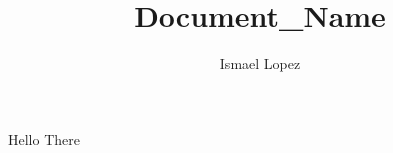 \documentclass[12pt, letterpaper]{amsart}
\title{Document_Name}
\author{Ismael Lopez}
\theoremstyle{remark}
\numberwithin{equation}{section} \numberwithin{thm}{section}
\numberwithin{rmk}{section} \numberwithin{figure}{section}
\begin{document}
Hello There
\end{document}
